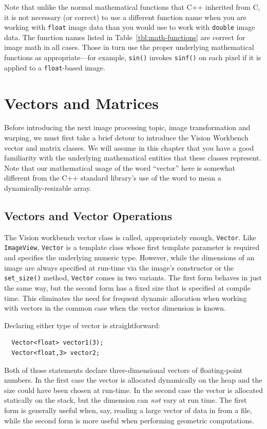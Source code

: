 Note that unlike the normal mathematical functions that C++ inherited
from C, it is not necessary (or correct) to use a different function
name when you are working with \verb#float# image data than you would
use to work with \verb#double# image data.  The function names listed
in Table~\ref{tbl:math-functions} are correct for image math in all
cases.  Those in turn use the proper underlying mathematical functions
as appropriate---for example, \verb#sin()# invokes \verb#sinf()# on 
each pixel if it is applied to a \verb#float#-based image.

\section{Vectors and Matrices}

Before introducing the next image processing topic, image transformation 
and warping, we must first take a brief detour to introduce the Vision 
Workbench vector and matrix classes.  We will assume in this chapter 
that you have a good familiarity with the underlying mathematical 
entities that these classes represent.  Note that our mathematical usage 
of the word ``vector'' here is somewhat different from the C++ standard 
library's use of the word to mean a dynamically-resizable array.

\subsection{Vectors and Vector Operations}

The Vision workbench vector class is called, appropriately enough, 
\verb#Vector#.  Like \verb#ImageView#, \verb#Vector# is a template 
class whose first template parameter is required and specifies the 
underlying numeric type.  However, while the dimensions of an image 
are always specified at run-time via the image's constructor or the 
\verb#set_size()# method, \verb#Vector# comes in two variants.  The 
first form behaves in just the same way, but the second form has a 
fixed size that is specified at compile time.  This eliminates the 
need for frequent dynamic allocation when working with vectors in 
the common case when the vector dimension is known.

Declaring either type of vector is straightforward:
\begin{verbatim}
  Vector<float> vector1(3);
  Vector<float,3> vector2;
\end{verbatim}
Both of those statements declare three-dimensional vectors of 
floating-point numbers.  In the first case the vector is allocated 
dynamically on the heap and the size could have been chosen at 
run-time.  In the second case the vector is allocated statically 
on the stack, but the dimension can {\it not} vary at run time.
The first form is generally useful when, say, reading a large 
vector of data in from a file, while the second form is more 
useful when performing geometric computations.

